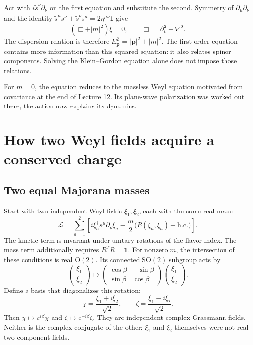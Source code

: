 \documentclass[11pt]{article}
\newcommand{\Lag}{\mathcal{L}}
\newcommand{\SO}{\mathrm{SO}}
\newcommand{\OO}{\mathrm{O}}
\newcommand{\one}{\mathbf 1}
\newcommand{\hc}{\mathrm{h.c.}}
\begin{document}
Act with \(i\widetilde s^\nu\partial_\nu\) on the first equation
and substitute the second. Symmetry of \(\partial_\mu\partial_\nu\)
and the identity \(\widetilde s^\mu s^\nu+\widetilde s^\nu s^\mu=2\eta^{\mu\nu}\one\) give
\begin{equation}
 (\Box+|m|^2)\xi=0,
 \qquad \Box=\partial_t^2-\nabla^2.
 \label{weyl:eq:kg}
\end{equation}
The dispersion relation is therefore \(E_{\bm p}^2=|\bm p|^2+|m|^2\).
The first-order equation contains more information than this squared
equation: it also relates spinor components. Solving the Klein--Gordon
equation alone does not impose those relations.

For \(m=0\), the equation reduces to the massless Weyl equation
motivated from covariance at the end of Lecture 12. Its plane-wave
polarization was worked out there; the action now explains its dynamics.

\section{How two Weyl fields acquire a conserved charge}
\subsection{Two equal Majorana masses}
Start with two independent Weyl fields \(\xi_1,\xi_2\), each with
the same real mass:
\begin{equation}
 \Lag=\sum_{a=1}^{2}\left[
 i\xi_a^\dagger s^\mu\partial_\mu\xi_a
 -\frac{m}{2}\big(B(\xi_a,\xi_a)+\hc\big)\right].
 \label{eq:twoequal}
\end{equation}
The kinetic term is invariant under unitary rotations of the flavor
index. The mass term additionally requires \(R^T R=\one\).
For nonzero \(m\), the intersection of these conditions is real
\(\OO(2)\). Its connected \(\SO(2)\) subgroup acts by
\begin{equation}
 \begin{pmatrix}\xi_1\\\xi_2\end{pmatrix}
 \longmapsto
 \begin{pmatrix}\cos\beta&-\sin\beta\\
                 \sin\beta&\cos\beta\end{pmatrix}
 \begin{pmatrix}\xi_1\\\xi_2\end{pmatrix}.
 \label{eq:flavorrot}
\end{equation}
Define a basis that diagonalizes this rotation:
\begin{equation}
 \chi=\frac{\xi_1+i\xi_2}{\sqrt2},\qquad
 \zeta=\frac{\xi_1-i\xi_2}{\sqrt2}.
 \label{eq:chizeta}
\end{equation}
Then \(\chi\mapsto e^{i\beta}\chi\) and
\(\zeta\mapsto e^{-i\beta}\zeta\). They are independent complex
Grassmann fields. Neither is the complex conjugate of the other:
\(\xi_1\) and \(\xi_2\) themselves were not real two-component fields.
\end{document}
